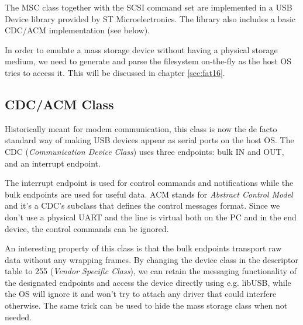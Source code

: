 




The MSC class together with the SCSI command set are implemented in a USB Device library provided by ST Microelectronics. The library also includes a basic CDC/ACM implementation (see below).

In order to emulate a mass storage device without having a physical storage medium, we need to generate and parse the filesystem on-the-fly as the host OS tries to access it. This will be discussed in chapter \ref{sec:fat16}.

\subsection{CDC/ACM Class} \label{sec:cdc-acm}


Historically meant for modem communication, this class is now the de facto standard way of making USB devices appear as serial ports on the host OS. The CDC (\textit{Communication Device Class}) uses three endpoints: bulk IN and OUT, and an interrupt endpoint. 

The interrupt endpoint is used for control commands and notifications while the bulk endpoints are used for useful data. ACM stands for \textit{Abstract Control Model} and it's a CDC's subclass that defines the control messages format. Since we don't use a physical UART and the line is virtual both on the PC and in the end device, the control commands can be ignored.

An interesting property of this class is that the bulk endpoints transport raw data without any wrapping frames. By changing the device class in the descriptor table to 255 (\textit{Vendor Specific Class}), we can retain the messaging functionality of the designated endpoints and access the device directly using e.g. libUSB, while the OS will ignore it and won't try to attach any driver that could interfere otherwise. The same trick can be used to hide the mass storage class when not needed.

